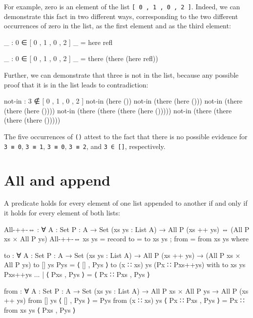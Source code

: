 For example, zero is an element of the list
\texttt{{[}\ 0\ ,\ 1\ ,\ 0\ ,\ 2\ {]}}. Indeed, we can demonstrate this
fact in two different ways, corresponding to the two different
occurrences of zero in the list, as the first element and as the third
element:

\begin{fence}
\begin{code}
_ : 0 ∈ [ 0 , 1 , 0 , 2 ]
_ = here refl

_ : 0 ∈ [ 0 , 1 , 0 , 2 ]
_ = there (there (here refl))
\end{code}
\end{fence}

Further, we can demonstrate that three is not in the list, because any
possible proof that it is in the list leads to contradiction:

\begin{fence}
\begin{code}
not-in : 3 ∉ [ 0 , 1 , 0 , 2 ]
not-in (here ())
not-in (there (here ()))
not-in (there (there (here ())))
not-in (there (there (there (here ()))))
not-in (there (there (there (there ()))))
\end{code}
\end{fence}

The five occurrences of \texttt{()} attest to the fact that there is no
possible evidence for \texttt{3\ ≡\ 0}, \texttt{3\ ≡\ 1},
\texttt{3\ ≡\ 0}, \texttt{3\ ≡\ 2}, and \texttt{3\ ∈\ {[}{]}},
respectively.

\hypertarget{all-and-append}{%
\section{All and append}\label{all-and-append}}

A predicate holds for every element of one list appended to another if
and only if it holds for every element of both lists:

\begin{fence}
\begin{code}
All-++-⇔ : ∀ {A : Set} {P : A → Set} (xs ys : List A) →
  All P (xs ++ ys) ⇔ (All P xs × All P ys)
All-++-⇔ xs ys =
  record
    { to       =  to xs ys
    ; from     =  from xs ys
    }
  where

  to : ∀ {A : Set} {P : A → Set} (xs ys : List A) →
    All P (xs ++ ys) → (All P xs × All P ys)
  to [] ys Pys = ⟨ [] , Pys ⟩
  to (x ∷ xs) ys (Px ∷ Pxs++ys) with to xs ys Pxs++ys
  ... | ⟨ Pxs , Pys ⟩ = ⟨ Px ∷ Pxs , Pys ⟩

  from : ∀ { A : Set} {P : A → Set} (xs ys : List A) →
    All P xs × All P ys → All P (xs ++ ys)
  from [] ys ⟨ [] , Pys ⟩ = Pys
  from (x ∷ xs) ys ⟨ Px ∷ Pxs , Pys ⟩ =  Px ∷ from xs ys ⟨ Pxs , Pys ⟩
\end{code}
\end{fence}

